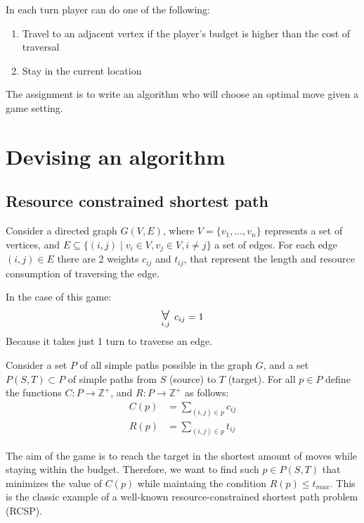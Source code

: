 \documentclass[12pt]{article}
\DeclareMathOperator*{\bigforall}{\mbox{\Large $\mathsurround0pt \forall$}}
\begin{document}
In each turn player can do one of the following:
\begin{enumerate}
    \item Travel to an adjacent vertex if the player's budget is higher than the cost of traversal
    \item Stay in the current location
\end{enumerate}

The assignment is to write an algorithm who will choose an optimal move given a game setting.

\section{Devising an algorithm}

\subsection{Resource constrained shortest path}

Consider a directed graph $G(V,E)$, where $V = \{v_1, \ldots , v_n\}$ represents a set of vertices,
and $E \subseteq \{ (i,j) \mid v_i \in V, v_j \in V, i \neq j \}$ a set of edges.
For each edge $(i,j) \in E$ there are 2 weights $c_{ij}$ and $t_{ij}$,
that represent the length and resource consumption of traversing the edge.

In the case of this game:
\begin{equation}
    \bigforall_{i,j} \; c_{ij} = 1
    \label{eq:all_cost_one}
\end{equation}
Because it takes just 1 turn to traverse an edge.

Consider a set $P$ of all simple paths possible in the graph $G$, and a set $P(S,T) \subset P$ of simple paths from $S$ (source) to $T$ (target).
For all $p \in P$ define the functions $C: P \to \mathbb{Z}^+$, and $R: P \to \mathbb{Z}^+$ as follows:
\begin{align}
    C(p) & = \sum\limits_{(i,j) \in p} c_{ij} \label{eq:len-func}  \\
    R(p) & = \sum\limits_{(i,j) \in p} t_{ij} \label{eq:cost-func}
\end{align}

The aim of the game is to reach the target in the shortest amount of moves while staying within the budget.
Therefore, we want to find such $p \in P(S,T)$ that minimizes the value of $C(p)$ while maintaing the condition $R(p) \leq t_{max}$.
This is the classic example of a well-known resource-constrained shortest path problem (RCSP).
\end{document}
